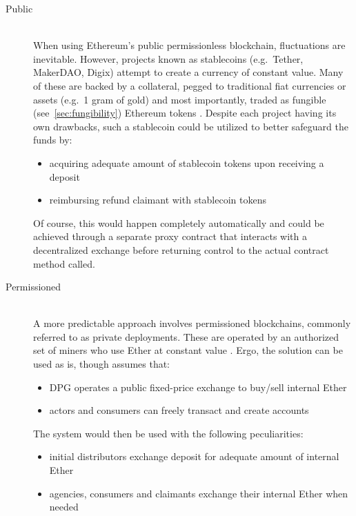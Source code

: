 \begin{description}
	\item[Public]
	\hfill \\
	When using Ethereum's public permissionless blockchain, fluctuations are inevitable. However, projects known as stablecoins (e.g.~Tether, MakerDAO, Digix) attempt to create a currency of constant value. Many of these are backed by a collateral, pegged to traditional fiat currencies or assets (e.g.~1 gram of gold) and most importantly, traded as fungible (see~\ref{sec:fungibility}) Ethereum tokens \cite{}. Despite each project having its own drawbacks, such a stablecoin could be utilized to better safeguard the funds by: 
	
	\begin{itemize}
  		\item acquiring adequate amount of stablecoin tokens upon receiving a deposit
  		\item reimbursing refund claimant with stablecoin tokens
	\end{itemize}

	Of course, this would happen completely automatically and could be achieved through a separate proxy contract that interacts with a decentralized exchange before returning control to the actual contract method called. 
	
	\item[Permissioned]
	\hfill \\
	A more predictable approach involves permissioned blockchains, commonly referred to as private deployments. These are operated by an authorized set of miners who use Ether at constant value \cite{}. Ergo, the solution can be used as is, though assumes that:

	\begin{itemize}
  		\item \ac{DPG} operates a public fixed-price exchange to buy/sell internal Ether
  		\item actors and consumers can freely transact and create accounts
	\end{itemize}
	
	The system would then be used with the following peculiarities:
		
	\begin{itemize}
  		\item initial distributors exchange deposit for adequate amount of internal Ether 
  		\item agencies, consumers and claimants exchange their internal Ether when needed
	\end{itemize}
	

\end{description}
